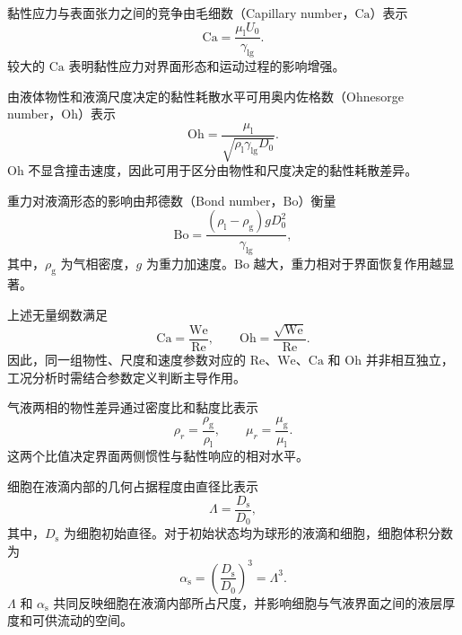 黏性应力与表面张力之间的竞争由毛细数（Capillary number，$\mathrm{Ca}$）表示
\begin{equation}
\mathrm{Ca}
=
\frac{\mu_{\mathrm l}U_0}{\gamma_{\mathrm{lg}}}.
\label{eq:ch2_ca}
\end{equation}
较大的 $\mathrm{Ca}$ 表明黏性应力对界面形态和运动过程的影响增强。

由液体物性和液滴尺度决定的黏性耗散水平可用奥内佐格数（Ohnesorge number，$\mathrm{Oh}$）表示
\begin{equation}
\mathrm{Oh}
=
\frac{\mu_{\mathrm l}}
{\sqrt{\rho_{\mathrm l}\gamma_{\mathrm{lg}}D_0}}.
\label{eq:ch2_oh}
\end{equation}
$\mathrm{Oh}$ 不显含撞击速度，因此可用于区分由物性和尺度决定的黏性耗散差异。

重力对液滴形态的影响由邦德数（Bond number，$\mathrm{Bo}$）衡量
\begin{equation}
\mathrm{Bo}
=
\frac{\left(\rho_{\mathrm l}-\rho_{\mathrm g}\right)gD_0^2}
{\gamma_{\mathrm{lg}}},
\label{eq:ch2_bo}
\end{equation}
其中，$\rho_{\mathrm g}$ 为气相密度，$g$ 为重力加速度。$\mathrm{Bo}$ 越大，重力相对于界面恢复作用越显著。

上述无量纲数满足
\begin{equation}
\mathrm{Ca}
=
\frac{\mathrm{We}}{\mathrm{Re}},
\qquad
\mathrm{Oh}
=
\frac{\sqrt{\mathrm{We}}}{\mathrm{Re}}.
\label{eq:ch2_dimensionless_relation}
\end{equation}
因此，同一组物性、尺度和速度参数对应的 $\mathrm{Re}$、$\mathrm{We}$、$\mathrm{Ca}$ 和 $\mathrm{Oh}$ 并非相互独立，工况分析时需结合参数定义判断主导作用。

气液两相的物性差异通过密度比和黏度比表示
\begin{equation}
\rho_r
=
\frac{\rho_{\mathrm g}}{\rho_{\mathrm l}},
\qquad
\mu_r
=
\frac{\mu_{\mathrm g}}{\mu_{\mathrm l}}.
\label{eq:ch2_property_ratio}
\end{equation}
这两个比值决定界面两侧惯性与黏性响应的相对水平。

细胞在液滴内部的几何占据程度由直径比表示
\begin{equation}
\Lambda
=
\frac{D_{\mathrm s}}{D_0},
\label{eq:ch2_size_ratio}
\end{equation}
其中，$D_{\mathrm s}$ 为细胞初始直径。对于初始状态均为球形的液滴和细胞，细胞体积分数为
\begin{equation}
\alpha_{\mathrm s}
=
\left(\frac{D_{\mathrm s}}{D_0}\right)^3
=
\Lambda^3.
\label{eq:ch2_volume_fraction}
\end{equation}
$\Lambda$ 和 $\alpha_{\mathrm s}$ 共同反映细胞在液滴内部所占尺度，并影响细胞与气液界面之间的液层厚度和可供流动的空间。


